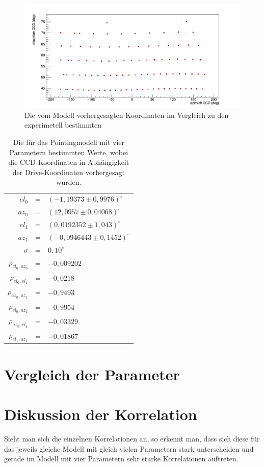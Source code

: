 \begin{figure}[htbp]
\centering
\includegraphics[width=\textwidth]{../341/D2C4comp2.png}
\caption{Die vom Modell vorhergesagten Koordinaten im Vergleich zu den experimetell bestimmten}
\label{img:D2C4comp2}
\end{figure}
\begin{table}[htbp]
\centering
\begin{tabular}{rcl}
\toprule
$el_0$ &=& $(-1,19373\pm 0,9976)^{\circ}$\\
$az_0$ &=& $(12,0957\pm0,04068)^{\circ}$\\
$el_1$ &=& $(0,0192352\pm 1,043)^{\circ}$\\
$az_1$ &=& $(-0,0946443\pm0,1452)^{\circ}$\\
$\sigma$ &=& $0,10^{\circ}$\\
$\rho_{el_0,az_0}$&=& $-0,009202$\\
$\rho_{el_0,el_1}$&=& $-0,0218$\\
$\rho_{az_0,az_1}$&=& $-0,9493$\\
$\rho_{el_0,az_1}$&=& $-0,9954$\\
$\rho_{az_0,el_1}$&=& $-0,03329$\\
$\rho_{el_1,az_1}$&=& $-0,01867$\\
\bottomrule
\end{tabular}
\label{tab:D2C4}
\caption{Die für das Pointingmodell mit vier Parametern bestimmten Werte, wobei die CCD-Koordinaten in Abhängigkeit der Drive-Koordinaten vorhergesagt wurden.}
\end{table}

\section{Vergleich der Parameter}

\section{Diskussion der Korrelation}
Sieht man sich die einzelnen Korrelationen an, so erkennt man, dass sich diese für das jeweils gleiche Modell mit gleich vielen Parametern stark unterscheiden und gerade im Modell mit vier Parametern sehr starke Korrelationen auftreten.
